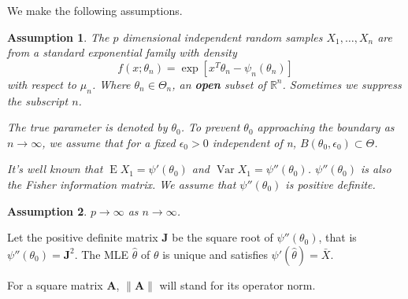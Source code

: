 \documentclass[11pt, letterpaper]{article}
\DeclareMathOperator{\myE}{E}
\DeclareMathOperator{\myVar}{Var}
\newcommand{\BA}{\mathbf{A}}    \newcommand{\BB}{\mathbf{B}}    \newcommand{\BC}{\mathbf{C}}    \newcommand{\BD}{\mathbf{D}}    \newcommand{\BE}{\mathbf{E}}    \newcommand{\BF}{\mathbf{F}}    \newcommand{\BG}{\mathbf{G}}    \newcommand{\BH}{\mathbf{H}}    \newcommand{\BI}{\mathbf{I}}    \newcommand{\BJ}{\mathbf{J}}    \newcommand{\BK}{\mathbf{K}}    \newcommand{\BL}{\mathbf{L}}
\theoremstyle{plain}
\newtheorem{assumption}{\quad\quad Assumption}
\theoremstyle{definition}
\theoremstyle{remark}
\begin{document}
We make the following assumptions.
\begin{assumption}\label{model}
    The $p$ dimensional independent random samples $X_1,\ldots, X_n$ are from a standard exponential family with density
    $$f(x;\theta_n)=\exp[x^T \theta_n-\psi_n(\theta_n)]$$ 
    with respect to $\mu_n$.
    Where $\theta_n\in\Theta_n$, an \textbf{open} subset of $\mathbb{R}^n$.
    Sometimes we suppress the subscript $n$.

    The true parameter is denoted by $\theta_0$.
    To prevent $\theta_0$ approaching the boundary as $n\to \infty$, we assume that for a fixed $\epsilon_0>0$ independent of n, $B(\theta_0,\epsilon_0)\subset \Theta$.


    It's well known that $\myE X_1=\psi'(\theta_0)$ and $\myVar X_1=\psi''(\theta_0)$. $\psi''(\theta_0)$ is also the Fisher information matrix. We assume that $\psi''(\theta_0)$ is positive definite.
\end{assumption}
\begin{assumption}\label{pAndN}
$p\to \infty$ as $n\to \infty$.
\end{assumption}

Let the positive definite matrix $\BJ$ be the  square root of $\psi''(\theta_0)$, that is $\psi''(\theta_0)=\BJ^2$.
The MLE $\hat{\theta}$ of $\theta$ is unique and satisfies $\psi'(\hat{\theta})=\bar{X}$.

For a square matrix $\BA$, $\|\BA\|$ will stand for its operator norm.
\end{document}
